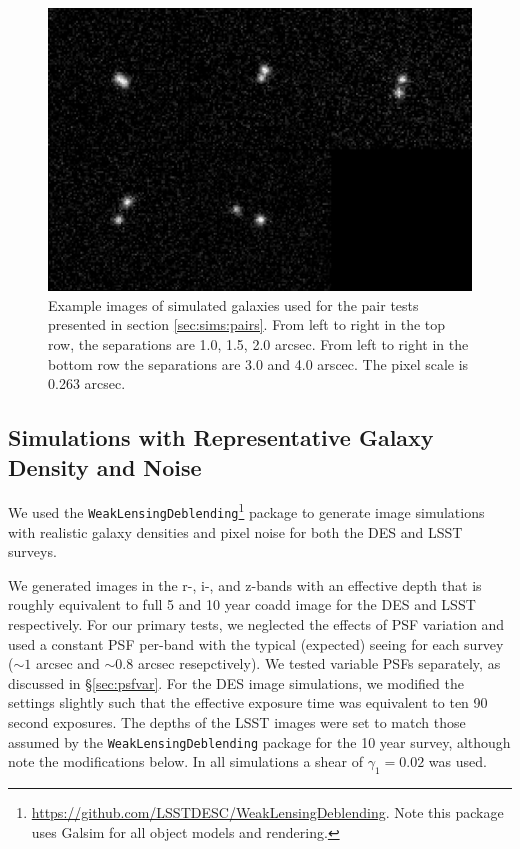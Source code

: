 \documentclass[iop, appendixfloats, numberedappendix, apj]{emulateapj}
\begin{document}
\begin{figure}
    \begin{center}
        \includegraphics[width=\textwidth]{figures/bdk-comb.png}
        \caption{Example images of simulated galaxies used for the pair tests
        presented in section \ref{sec:sims:pairs}.  From left to right in the top row,
        the separations are 1.0, 1.5, 2.0 arcsec. From left to right in the bottom row the
        separations are 3.0 and 4.0 arscec. The pixel scale is 0.263 arcsec.
        \label{fig:pairs}}
    \end{center}
\end{figure}

\subsection{Simulations with Representative Galaxy Density and Noise}
\label{sec:sims:realgals}

We used the
\texttt{WeakLensingDeblending}\footnote{\url{https://github.com/LSSTDESC/WeakLensingDeblending}.
Note this package uses Galsim for all object models and rendering.} package to
generate image simulations with realistic galaxy densities and pixel noise for
both the DES and LSST surveys.

We generated images in the r-, i-, and z-bands with an effective depth that is
roughly equivalent to full 5 and 10 year coadd image for the DES and LSST
respectively. For our primary tests, we neglected the effects of PSF variation
and used a constant PSF per-band with the typical (expected) seeing for each
survey ($\sim\!1$ arcsec and $\sim\!0.8$ arcsec resepctively). We tested
variable PSFs separately, as discussed in \S \ref{sec:psfvar}.  For the DES
image simulations, we modified the settings slightly such that the effective
exposure time was equivalent to ten 90 second exposures. The depths of the LSST
images were set to match those assumed by the \texttt{WeakLensingDeblending}
package for the 10 year survey, although note the modifications below. In all
simulations a shear of $\gamma_1 = 0.02$ was used.
\end{document}
